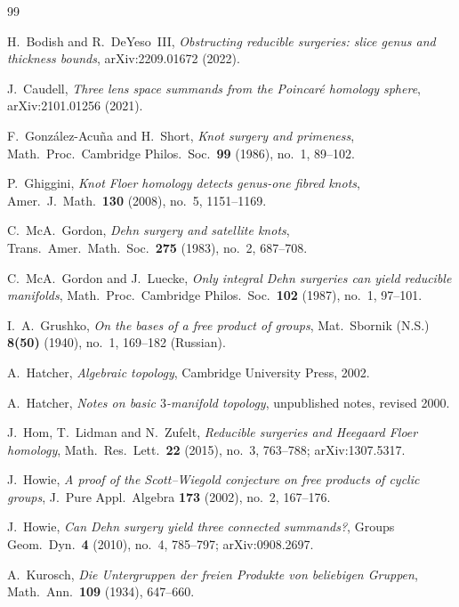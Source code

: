 \documentclass[12pt]{article}
\theoremstyle{definition}
\theoremstyle{remark}
\begin{document}
\begin{thebibliography}{99}

H.~Bodish and R.~DeYeso~III,
\emph{Obstructing reducible surgeries: slice genus and thickness bounds},
arXiv:2209.01672 (2022).

J.~Caudell,
\emph{Three lens space summands from the Poincar\'e homology sphere},
arXiv:2101.01256 (2021).

F.~Gonz\'alez-Acu\~na and H.~Short,
\emph{Knot surgery and primeness},
Math.\ Proc.\ Cambridge Philos.\ Soc.\ \textbf{99} (1986), no.~1, 89--102.

P.~Ghiggini,
\emph{Knot Floer homology detects genus-one fibred knots},
Amer.\ J.\ Math.\ \textbf{130} (2008), no.~5, 1151--1169.

C.~McA.~Gordon,
\emph{Dehn surgery and satellite knots},
Trans.\ Amer.\ Math.\ Soc.\ \textbf{275} (1983), no.~2, 687--708.

C.~McA.~Gordon and J.~Luecke,
\emph{Only integral Dehn surgeries can yield reducible manifolds},
Math.\ Proc.\ Cambridge Philos.\ Soc.\ \textbf{102} (1987), no.~1, 97--101.

I.~A.~Grushko,
\emph{On the bases of a free product of groups},
Mat.\ Sbornik (N.S.) \textbf{8(50)} (1940), no.~1, 169--182 (Russian).

A.~Hatcher,
\emph{Algebraic topology},
Cambridge University Press, 2002.

A.~Hatcher,
\emph{Notes on basic \(3\)-manifold topology},
unpublished notes, revised 2000.

J.~Hom, T.~Lidman and N.~Zufelt,
\emph{Reducible surgeries and Heegaard Floer homology},
Math.\ Res.\ Lett.\ \textbf{22} (2015), no.~3, 763--788; arXiv:1307.5317.

J.~Howie,
\emph{A proof of the Scott--Wiegold conjecture on free products of
cyclic groups},
J.\ Pure Appl.\ Algebra \textbf{173} (2002), no.~2, 167--176.

J.~Howie,
\emph{Can Dehn surgery yield three connected summands?},
Groups Geom.\ Dyn.\ \textbf{4} (2010), no.~4, 785--797; arXiv:0908.2697.

A.~Kurosch,
\emph{Die Untergruppen der freien Produkte von beliebigen Gruppen},
Math.\ Ann.\ \textbf{109} (1934), 647--660.


\end{thebibliography}
\end{document}
